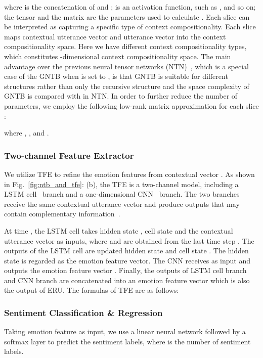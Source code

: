 \documentclass[journal]{IEEEtran}
\begin{document}
where  is the concatenation of  and ;  is an activation function, such as ,  and so on; the tensor  and the matrix  are the parameters used to calculate . Each slice  can be interpreted as capturing a specific type of context compositionality. Each slice  maps contextual utterance vector  and utterance vector  into the context compositionality space. Here we have  different context compositionality types, which constitutes -dimensional context compositionality space. The main advantage over the previous neural tensor networks (NTN)~\cite{socher2013reasoning}, which is a special case of the GNTB when  is set to , is that GNTB is suitable for different structures rather than only the recursive structure and the space complexity of GNTB is  compared with  in NTN. In order to further reduce the number of parameters, we employ the following low-rank matrix approximation for each slice :

where , ,  and .


\subsubsection{Two-channel Feature Extractor}

We utilize TFE to refine the emotion features from contextual vector . As shown in Fig.~\ref{fig:ntb_and_tfe}: (b), the TFE is a two-channel model, including a LSTM cell~\cite{hochreiter1997long} branch and a one-dimensional CNN~\cite{kim2014convolutional} branch. The two branches receive the same contextual utterance vector  and produce outputs that may contain complementary information~\cite{li2020user}.

At time , the LSTM cell takes hidden state , cell state  and the contextual utterance vector  as inputs, where  and  are obtained from the last time step . The outputs of the LSTM cell are updated hidden state  and cell state . The hidden state  is regarded as the emotion feature vector. The CNN receives  as input and outputs the emotion feature vector . Finally, the outputs of LSTM cell branch  and CNN branch  are concatenated into an emotion feature vector  which is also the output of ERU. The formulas of TFE are as follows:



\subsubsection{Sentiment Classification \& Regression}
Taking emotion feature  as input, we use a linear neural network  followed by a softmax layer to predict the sentiment labels, where  is the number of sentiment labels.
\end{document}
